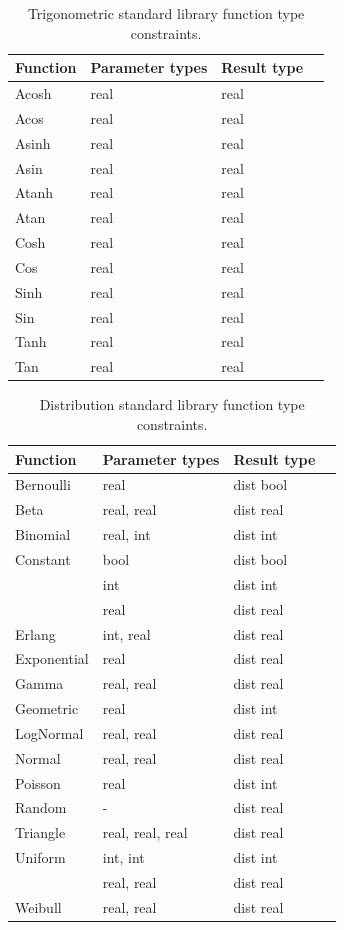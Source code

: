 {\begin{table}
  \centering
  \begin{tabular}{l l l l}
    \textbf{Function} & \textbf{Parameter types} & \textbf{Result type} \\
    \hline
    Acosh & real & real \\
    Acos & real & real \\
    Asinh & real & real \\
    Asin & real & real \\
    Atanh & real & real \\
    Atan & real & real \\
    Cosh & real & real \\
    Cos & real & real \\
    Sinh & real & real \\
    Sin & real & real \\
    Tanh & real & real \\
    Tan & real & real \\
    \hline
  \end{tabular}
  \caption{Trigonometric standard library function type constraints.}
  \label{tbl:stdlib-trig-types}
\end{table}

\begin{table}
  \centering
  \begin{tabular}{l l l l}
    \textbf{Function} & \textbf{Parameter types} & \textbf{Result type} \\
    \hline
    Bernoulli & real & dist bool \\
    Beta & real, real & dist real \\
    Binomial & real, int & dist int \\
    Constant & bool & dist bool \\
             & int & dist int \\
             & real & dist real \\
    Erlang & int, real & dist real \\
    Exponential & real & dist real \\
    Gamma & real, real & dist real \\
    Geometric & real & dist int \\
    LogNormal & real, real & dist real \\
    Normal & real, real & dist real \\
    Poisson & real & dist int \\
    Random & - & dist real \\
    Triangle & real, real, real & dist real \\
    Uniform & int, int & dist int \\
            & real, real & dist real \\
    Weibull & real, real & dist real \\
  \end{tabular}
  \caption{Distribution standard library function type constraints.}
  \label{tbl:stdlib-dist-types}
\end{table}
}

